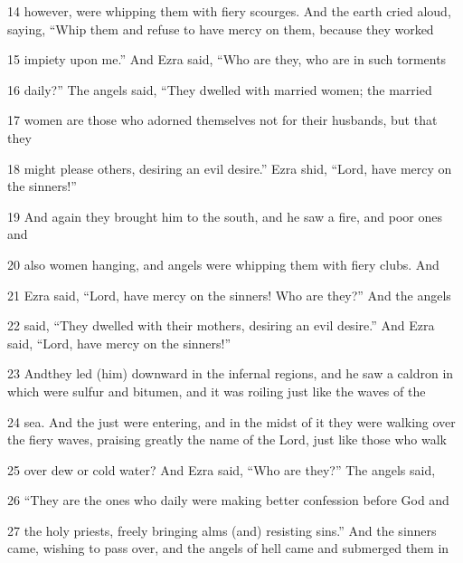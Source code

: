 \par 14 however, were whipping them with fiery scourges. And the earth cried aloud, saying, “Whip them and refuse to have mercy on them, because they worked

\par 15 impiety upon me.” And Ezra said, “Who are they, who are in such torments

\par 16 daily?” The angels said, “They dwelled with married women; the married

\par 17 women are those who adorned themselves not for their husbands, but that they

\par 18 might please others, desiring an evil desire.” Ezra shid, “Lord, have mercy on the sinners!”

\par 19 And again they brought him to the south, and he saw a fire, and poor ones and

\par 20 also women hanging, and angels were whipping them with fiery clubs. And

\par 21 Ezra said, “Lord, have mercy on the sinners! Who are they?” And the angels

\par 22 said, “They dwelled with their mothers, desiring an evil desire.” And Ezra said, “Lord, have mercy on the sinners!”

\par 23 Andthey led (him) downward in the infernal regions, and he saw a caldron in which were sulfur and bitumen, and it was roiling just like the waves of the

\par 24 sea. And the just were entering, and in the midst of it they were walking over the fiery waves, praising greatly the name of the Lord, just like those who walk

\par 25 over dew or cold water? And Ezra said, “Who are they?” The angels said,
\par 26 “They are the ones who daily were making better confession before God and

\par 27 the holy priests, freely bringing alms (and) resisting sins.” And the sinners came, wishing to pass over, and the angels of hell came and submerged them in

